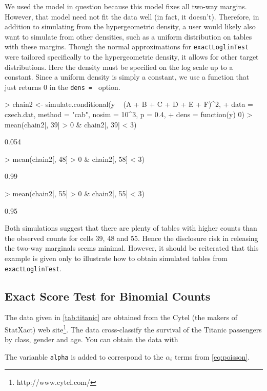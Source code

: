 \documentclass[a4paper]{article}
\begin{document}
We used the model in question because this model fixes all two-way
margins.  However, that model need not fit the data well (in fact, it
doesn't). Therefore, in addition to simulating from the hypergeometric
density, a user would likely also want to simulate from other
densities, such as a uniform distribution on tables with these
margins. Though the normal approximations for \texttt{exactLoglinTest} 
were tailored specifically to the hypergeometric density, it 
allows for other target distributions. Here the density must be specified 
on the log scale up to a constant. Since a uniform density is simply a 
constant, we use a function that just returns 0 in the \texttt{dens = }
option.
\begin{Schunk}
\begin{Sinput}
> chain2 <- simulate.conditional(y ~ (A + B + C + D + E + F)^2, 
+     data = czech.dat, method = "cab", nosim = 10^3, p = 0.4, 
+     dens = function(y) 0)
> mean(chain2[, 39] > 0 & chain2[, 39] < 3)
\end{Sinput}
\begin{Soutput}
[1] 0.054
\end{Soutput}
\begin{Sinput}
> mean(chain2[, 48] > 0 & chain2[, 58] < 3)
\end{Sinput}
\begin{Soutput}
[1] 0.99
\end{Soutput}
\begin{Sinput}
> mean(chain2[, 55] > 0 & chain2[, 55] < 3)
\end{Sinput}
\begin{Soutput}
[1] 0.95
\end{Soutput}
\end{Schunk}

Both simulations suggest that there are plenty of tables with higher
counts than the observed counts for cells 39, 48 and 55. Hence the
disclosure risk in releasing the two-way marginals seems minimal.
However, it should be reiterated that this example is given only to
illustrate how to obtain simulated tables from
\texttt{exactLoglinTest}.

\subsection{Exact Score Test for Binomial Counts}
The data given in \ref{tab:titanic} are obtained from the Cytel (the makers
of StatXact) web site\footnote{http://www.cytel.com/}. The data cross-classify the
survival of the Titanic passengers by class, gender and age. You can
obtain the data with
\begin{Schunk}
\end{Schunk}
The varianble \texttt{alpha} is added to correspond to the $\alpha_i$
terms from \eqref{eq:poisson}.
\end{document}
